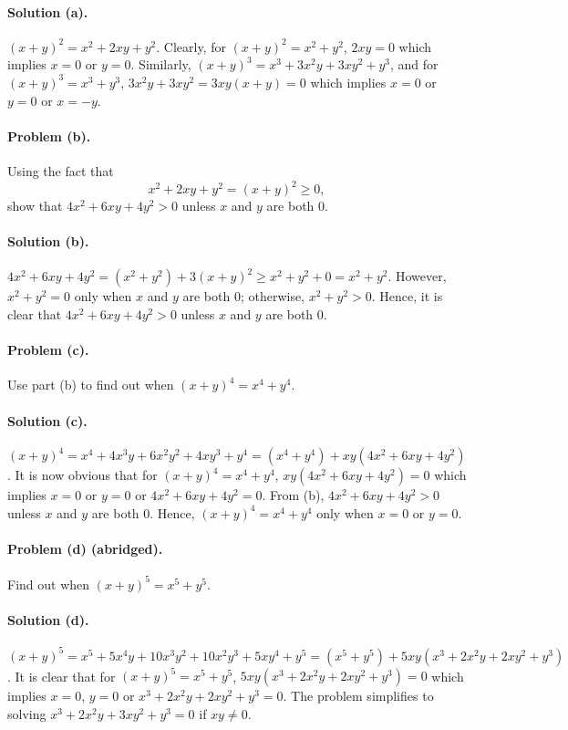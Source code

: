 \documentclass{article}
\begin{document}
\paragraph{Solution (a).} $(x + y)^2 = x^2 + 2xy + y^2$. Clearly, for $(x + y)^2 = x^2 + y^2$, $2xy = 0$ which implies $x = 0$ or $y = 0$. Similarly, $(x + y)^3 = x^3 + 3x^2y + 3xy^2 + y^3$, and for $(x + y)^3 = x^3 + y^3$, $3x^2y + 3xy^2 = 3xy(x + y) = 0$ which implies $x = 0$ or $y = 0$ or $x = -y$.

\paragraph{Problem (b).} Using the fact that \begin{equation*}
  x^2 + 2xy + y^2 = (x + y)^2 \geq 0,
\end{equation*} show that $4x^2 + 6xy + 4y^2 > 0$ unless $x$ and $y$ are both 0.

\paragraph{Solution (b).} $4x^2 + 6xy + 4y^2 = (x^2 + y^2) + 3(x + y)^2 \geq x^2 + y^2 + 0 = x^2 + y^2$. However, $x^2 + y^2 = 0$ only when $x$ and $y$ are both 0; otherwise, $x^2 + y^2 > 0$.  Hence, it is clear that $4x^2 + 6xy + 4y^2 > 0$ unless $x$ and $y$ are both 0.

\paragraph{Problem (c).} Use part (b) to find out when $(x + y)^4 = x^4 + y^4$.

\paragraph{Solution (c).} $(x + y)^4 = x^4 + 4x^3y + 6x^2y^2 + 4xy^3 + y^4 = (x^4 + y^4) + xy(4x^2 + 6xy + 4y^2)$. It is now obvious that for $(x + y)^4 = x^4 + y^4$, $xy(4x^2 + 6xy + 4y^2) = 0$ which implies $x = 0$ or $y = 0$ or $4x^2 + 6xy + 4y^2 = 0$. From (b), $4x^2 + 6xy + 4y^2 > 0$ unless $x$ and $y$ are both 0. Hence, $(x + y)^4 = x^4 + y^4$ only when $x = 0$ or $y = 0$.

\paragraph{Problem (d) (abridged).} Find out when $(x + y)^5 = x^5 + y^5$.

\paragraph{Solution (d).} $(x + y)^5 = x^5 + 5x^4y + 10x^3y^2 + 10x^2y^3 + 5xy^4 + y^5 = (x^5 + y^5) + 5xy(x^3 + 2x^2y + 2xy^2 + y^3)$. It is clear that for $(x + y)^5 = x^5 + y^5$, $5xy(x^3 + 2x^2y + 2xy^2 + y^3) = 0$ which implies $x = 0$, $y = 0$ or $x^3 + 2x^2y + 2xy^2 + y^3 = 0$. The problem simplifies to solving $x^3 + 2x^2y + 3xy^2 + y^3 = 0$ if $xy \neq 0$.
\end{document}
